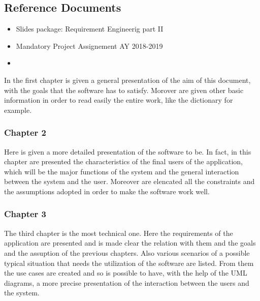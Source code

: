 \begin{flushleft}
{\color{Blue}\subsection{Reference Documents}}
\begin{itemize}
\item Slides package: Requirement Engineerig part II
\item Mandatory Project Assignement AY 2018-2019
\item 
\end{itemize}
 
{}
{}
In the first chapter is given a general presentation of the aim of this document, with the goals that the software has to satisfy. Morover are given other basic information in order to read easily the entire work, like the dictionary for example.
\paragraph{}

{\color{Blue}\subsubsection{Chapter 2}}
Here is given a more detailed presentation of the software to be. In fact, in this chapter are presented the characteristics of the final users of the application, which will be the major functions of the system and the general interaction between the system and the user.
Moreover are elencated all the constraints and the assumptions adopted in order to make the software work well.
\paragraph{}

{\color{Blue}\subsubsection{Chapter 3}}
The third chapter is the most technical one. Here the requirements of the application are presented and is made clear the relation with them and the goals and the assuption of the previous chapters. Also various scenarios of a possible typical situation that needs the utilization of the software are listed. From them the use cases are created and so is possible to have, with the help of the UML diagrams, a more precise presentation of the interaction between the users and the system.

\end{flushleft}

